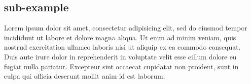 
\subsection{sub-example}
Lorem ipsum dolor sit amet, consectetur adipisicing elit, sed do eiusmod
tempor incididunt ut labore et dolore magna aliqua. Ut enim ad minim veniam,
quis nostrud exercitation ullamco laboris nisi ut aliquip ex ea commodo
consequat. Duis aute irure dolor in reprehenderit in voluptate velit esse
cillum dolore eu fugiat nulla pariatur. Excepteur sint occaecat cupidatat non
proident, sunt in culpa qui officia deserunt mollit anim id est laborum.

